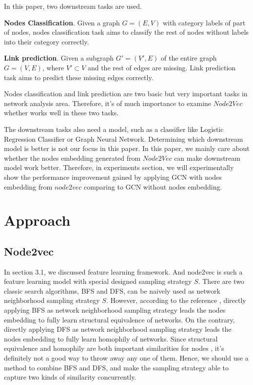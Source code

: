 \documentclass[sigconf]{acmart}
\begin{document}
In this paper, two downstream tasks are used.\par
\vspace{0.2cm}
\noindent\textbf{Nodes Classification}. Given a graph $G=(E,V)$ with category labels of part of nodes, nodes classification task aims to classify the rest of nodes without labels into their category correctly.\par
\vspace{0.2cm}
\noindent\textbf{Link prediction}. Given a subgraph $G'=(V',E)$ of the entire graph $G=(V,E)$, where $V'\subset V$ and the rest of edges are missing. Link prediction task aims to predict these missing edges correctly.\par
\vspace{0.2cm}
Nodes classification and link prediction are two basic but very important tasks in network analysis area. Therefore, it's of much importance to examine $Node2Vec$ whether works well in these two tasks.

The downstream tasks also need a model, such as a classifier like Logistic Regression Classifier or Graph Neural Network. Determining which downstream model is better is not our focus in this paper. In this paper, we mainly care about whether the nodes embedding generated from $Node2Vec$ can make downstream model work better. Therefore, in experiments section, we will experimentally show the performance improvement gained by applying GCN with nodes embedding from $node2vec$ comparing to GCN without nodes embedding.


\section{Approach}

\subsection{Node2vec}

In section 3.1, we discussed feature learning framework. And node2vec is such a feature learning model with special designed sampling strategy $S$. There are two classic search algorithms, BFS and DFS, can be naively used as network neighborhood sampling strategy $S$. However, according to the reference \cite{node2vec}, directly applying BFS as network neighborhood sampling strategy leads the nodes embedding to fully learn structural equivalence of networks. On the contrary, directly applying DFS as network neighborhood sampling strategy leads the nodes embedding to fully learn homophily of networks. Since structural equivalence and homophily are both important similarities for nodes \cite{mikolov2013distributed}, it's definitely not a good way to throw away any one of them. Hence, we should use a method to combine BFS and DFS, and make the sampling strategy able to capture two kinds of similarity concurrently.
\end{document}
